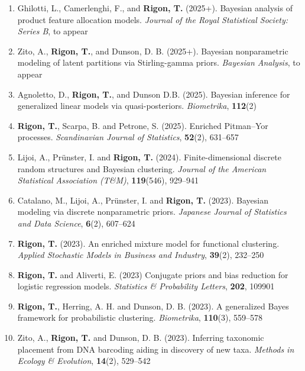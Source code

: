\documentclass[10pt]{article}
\begin{document}
\begin{enumerate}

\item Ghilotti, L., Camerlenghi, F., and \textbf{Rigon, T.} (2025+). Bayesian analysis of product feature allocation models. \textit{Journal of the Royal Statistical Society: Series B}, to appear


\item Zito, A., \textbf{Rigon, T.}, and Dunson, D. B. (2025+). Bayesian nonparametric modeling of latent partitions via Stirling-gamma priors. \textit{Bayesian Analysis}, to appear

\item Agnoletto, D., \textbf{Rigon, T.}, and Dunson D.B. (2025). Bayesian inference for generalized linear models via quasi-posteriors. \emph{Biometrika}, \textbf{112}(2)

\item \textbf{Rigon, T.}, Scarpa, B. and Petrone, S. (2025). Enriched Pitman--Yor processes. \textit{Scandinavian Journal of Statistics}, \textbf{52}(2), 631--657

\item Lijoi, A., Pr\"unster, I. and \textbf{Rigon, T.} (2024). Finite-dimensional discrete random structures and Bayesian clustering. \textit{Journal of the American Statistical Association (T\&M)}, \textbf{119}(546), 929--941

\item Catalano, M., Lijoi, A., Pr\"unster, I. and \textbf{Rigon, T.} (2023). Bayesian modeling via discrete nonparametric priors. \textit{Japanese Journal of Statistics and Data Science}, \textbf{6}(2), 607--624

\item \textbf{Rigon, T.} (2023). An enriched mixture model for functional clustering. \emph{Applied Stochastic Models in Business and Industry}, \textbf{39}(2), 232--250

\item \textbf{Rigon, T.} and Aliverti, E. (2023) Conjugate priors and bias reduction for logistic regression models. \textit{Statistics \& Probability Letters}, \textbf{202}, 109901

\item \textbf{Rigon, T.}, Herring, A. H. and Dunson, D. B. (2023). A generalized Bayes framework for probabilistic clustering. \textit{Biometrika}, \textbf{110}(3), 559--578

\item Zito, A., \textbf{Rigon, T.} and Dunson, D. B. (2023). Inferring taxonomic placement from DNA barcoding aiding in discovery of new taxa. \emph{Methods in Ecology \& Evolution}, \textbf{14}(2), 529--542


\end{enumerate}
\end{document}
